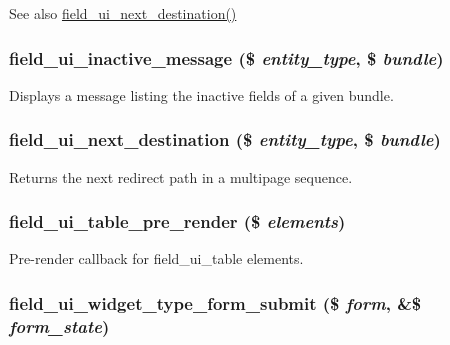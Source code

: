 \begin{DoxySeeAlso}{See also}
\hyperlink{field__ui_8admin_8inc_ae2e29e187f0b5b94977a59e32a825dd7}{field\_\-ui\_\-next\_\-destination()} 
\end{DoxySeeAlso}
\hypertarget{field__ui_8admin_8inc_a61dfac68260a4115c338ff7c0432c64c}{
\subsubsection[{field\_\-ui\_\-inactive\_\-message}]{\setlength{\rightskip}{0pt plus 5cm}field\_\-ui\_\-inactive\_\-message (\$ {\em entity\_\-type}, \/  \$ {\em bundle})}}
\label{field__ui_8admin_8inc_a61dfac68260a4115c338ff7c0432c64c}
Displays a message listing the inactive fields of a given bundle. \hypertarget{field__ui_8admin_8inc_ae2e29e187f0b5b94977a59e32a825dd7}{
\subsubsection[{field\_\-ui\_\-next\_\-destination}]{\setlength{\rightskip}{0pt plus 5cm}field\_\-ui\_\-next\_\-destination (\$ {\em entity\_\-type}, \/  \$ {\em bundle})}}
\label{field__ui_8admin_8inc_ae2e29e187f0b5b94977a59e32a825dd7}
Returns the next redirect path in a multipage sequence. \hypertarget{field__ui_8admin_8inc_a3aaaf5a32e48e5cebdae7abb960fb0fc}{
\subsubsection[{field\_\-ui\_\-table\_\-pre\_\-render}]{\setlength{\rightskip}{0pt plus 5cm}field\_\-ui\_\-table\_\-pre\_\-render (\$ {\em elements})}}
\label{field__ui_8admin_8inc_a3aaaf5a32e48e5cebdae7abb960fb0fc}
Pre-\/render callback for field\_\-ui\_\-table elements. \hypertarget{field__ui_8admin_8inc_a0e5ede7769ff7c3d89a90096f0390c35}{
\subsubsection[{field\_\-ui\_\-widget\_\-type\_\-form\_\-submit}]{\setlength{\rightskip}{0pt plus 5cm}field\_\-ui\_\-widget\_\-type\_\-form\_\-submit (\$ {\em form}, \/  \&\$ {\em form\_\-state})}}
